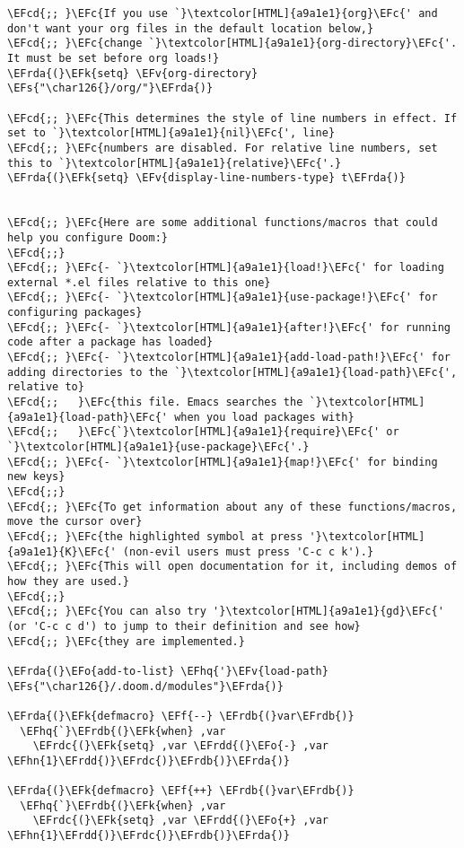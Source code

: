 \documentclass[a4wide,10pt]{article}
\newcommand{\EFc}[1]{\textcolor{EFc}{#1}} %
\newcommand{\EFcd}[1]{\textcolor{EFcd}{#1}} %
\newcommand{\EFs}[1]{\textcolor{EFs}{#1}} %
\newcommand{\EFk}[1]{\textcolor{EFk}{#1}} %
\newcommand{\EFf}[1]{\textcolor{EFf}{#1}} %
\newcommand{\EFv}[1]{\textcolor{EFv}{#1}} %
\newcommand{\EFo}[1]{\textcolor{EFo}{#1}} %
\newcommand{\EFhn}[1]{\textcolor{EFhn}{\textbf{#1}}} %
\newcommand{\EFhq}[1]{\textcolor{EFhq}{#1}} %
\newcommand{\EFrda}[1]{\textcolor{EFrda}{#1}} %
\newcommand{\EFrdb}[1]{\textcolor{EFrdb}{#1}} %
\newcommand{\EFrdc}[1]{\textcolor{EFrdc}{#1}} %
\newcommand{\EFrdd}[1]{\textcolor{EFrdd}{#1}} %
\begin{document}
\begin{Code}
\begin{Verbatim}
\EFcd{;; }\EFc{If you use `}\textcolor[HTML]{a9a1e1}{org}\EFc{' and don't want your org files in the default location below,}
\EFcd{;; }\EFc{change `}\textcolor[HTML]{a9a1e1}{org-directory}\EFc{'. It must be set before org loads!}
\EFrda{(}\EFk{setq} \EFv{org-directory} \EFs{"\char126{}/org/"}\EFrda{)}

\EFcd{;; }\EFc{This determines the style of line numbers in effect. If set to `}\textcolor[HTML]{a9a1e1}{nil}\EFc{', line}
\EFcd{;; }\EFc{numbers are disabled. For relative line numbers, set this to `}\textcolor[HTML]{a9a1e1}{relative}\EFc{'.}
\EFrda{(}\EFk{setq} \EFv{display-line-numbers-type} t\EFrda{)}


\EFcd{;; }\EFc{Here are some additional functions/macros that could help you configure Doom:}
\EFcd{;;}
\EFcd{;; }\EFc{- `}\textcolor[HTML]{a9a1e1}{load!}\EFc{' for loading external *.el files relative to this one}
\EFcd{;; }\EFc{- `}\textcolor[HTML]{a9a1e1}{use-package!}\EFc{' for configuring packages}
\EFcd{;; }\EFc{- `}\textcolor[HTML]{a9a1e1}{after!}\EFc{' for running code after a package has loaded}
\EFcd{;; }\EFc{- `}\textcolor[HTML]{a9a1e1}{add-load-path!}\EFc{' for adding directories to the `}\textcolor[HTML]{a9a1e1}{load-path}\EFc{', relative to}
\EFcd{;;   }\EFc{this file. Emacs searches the `}\textcolor[HTML]{a9a1e1}{load-path}\EFc{' when you load packages with}
\EFcd{;;   }\EFc{`}\textcolor[HTML]{a9a1e1}{require}\EFc{' or `}\textcolor[HTML]{a9a1e1}{use-package}\EFc{'.}
\EFcd{;; }\EFc{- `}\textcolor[HTML]{a9a1e1}{map!}\EFc{' for binding new keys}
\EFcd{;;}
\EFcd{;; }\EFc{To get information about any of these functions/macros, move the cursor over}
\EFcd{;; }\EFc{the highlighted symbol at press '}\textcolor[HTML]{a9a1e1}{K}\EFc{' (non-evil users must press 'C-c c k').}
\EFcd{;; }\EFc{This will open documentation for it, including demos of how they are used.}
\EFcd{;;}
\EFcd{;; }\EFc{You can also try '}\textcolor[HTML]{a9a1e1}{gd}\EFc{' (or 'C-c c d') to jump to their definition and see how}
\EFcd{;; }\EFc{they are implemented.}

\EFrda{(}\EFo{add-to-list} \EFhq{'}\EFv{load-path} \EFs{"\char126{}/.doom.d/modules"}\EFrda{)}

\EFrda{(}\EFk{defmacro} \EFf{--} \EFrdb{(}var\EFrdb{)}
  \EFhq{`}\EFrdb{(}\EFk{when} ,var
    \EFrdc{(}\EFk{setq} ,var \EFrdd{(}\EFo{-} ,var \EFhn{1}\EFrdd{)}\EFrdc{)}\EFrdb{)}\EFrda{)}

\EFrda{(}\EFk{defmacro} \EFf{++} \EFrdb{(}var\EFrdb{)}
  \EFhq{`}\EFrdb{(}\EFk{when} ,var
    \EFrdc{(}\EFk{setq} ,var \EFrdd{(}\EFo{+} ,var \EFhn{1}\EFrdd{)}\EFrdc{)}\EFrdb{)}\EFrda{)}



\end{Verbatim}
\end{Code}
\end{document}
